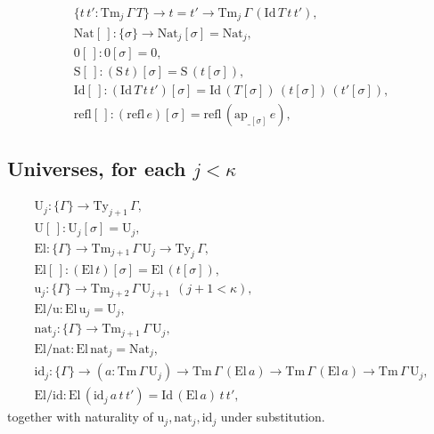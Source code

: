 \[\begin{array}{l}
        \{t\,t':\mathrm{Tm}_j\,\Gamma\,T\}\to
        t=t'\to\mathrm{Tm}_j\,\Gamma\,
            (\mathrm{Id}\,T\,t\,t'),\\
    \mathrm{Nat}[\,] : \{\sigma\}\to
        \mathrm{Nat}_j[\sigma]=\mathrm{Nat}_j,\\
    0[\,] : 0[\sigma]=0,\\
    \mathrm S[\,] :
        (\mathrm S\,t)[\sigma]=\mathrm S\,(t[\sigma]),\\
    \mathrm{Id}[\,] :
        (\mathrm{Id}\,T\,t\,t')[\sigma] =
        \mathrm{Id}\,(T[\sigma])\,(t[\sigma])\,
        (t'[\sigma]),\\
    \mathrm{refl}[\,] :
        (\mathrm{refl}\,e)[\sigma] =
        \mathrm{refl}\,(\mathrm{ap}_{\_[\sigma]}\,e),
\end{array}\]

\subsection{Universes, for each
\texorpdfstring{$j<\kappa$}{j<k}}
\[\begin{array}{l}
    \mathrm U_j :
        \{\Gamma\}\to\mathrm{Ty}_{j+1}\,\Gamma,\\
    \mathrm U[\,] : \mathrm U_j[\sigma]=\mathrm U_j,\\
    \mathrm{El} :
        \{\Gamma\}\to\mathrm{Tm}_{j+1}\,
        \Gamma\,\mathrm U_j\to\mathrm{Ty}_j\,\Gamma,\\
    \mathrm{El}[\,] :
        (\mathrm{El}\,t)[\sigma]=
        \mathrm{El}\,(t[\sigma]),\\
    \mathrm u_j : \{\Gamma\}\to\mathrm{Tm}_{j+2}\,
        \Gamma\,\mathrm U_{j+1}\ \ (j+1<\kappa),\\
    \mathrm{El/u} : \mathrm{El}\,\mathrm u_j =
        \mathrm U_j,\\
    \mathrm{nat}_j : \{\Gamma\}\to\mathrm{Tm}_{j+1}\,
        \Gamma\,\mathrm U_j,\\
    \mathrm{El/nat} :
        \mathrm{El}\,\mathrm{nat}_j=\mathrm{Nat}_j,\\
    \mathrm{id}_j :
        \{\Gamma\}\to(a:\mathrm{Tm}\,\Gamma\,
        \mathrm U_j)\to\mathrm{Tm}\,\Gamma\,(
        \mathrm{El}\,a)\to\mathrm{Tm}\,\Gamma\,(
        \mathrm{El}\,a)\to\mathrm{Tm}\,\Gamma\,
        \mathrm U_j,\\
    \mathrm{El/id} :
        \mathrm{El}\,(\mathrm{id}_j\,a\,t\,t')=
        \mathrm{Id}\,(\mathrm{El}\,a)\,t\,t',
\end{array}\]
together with naturality of $\mathrm u_j,\mathrm{nat}_j,\mathrm{id}_j$ under substitution.


